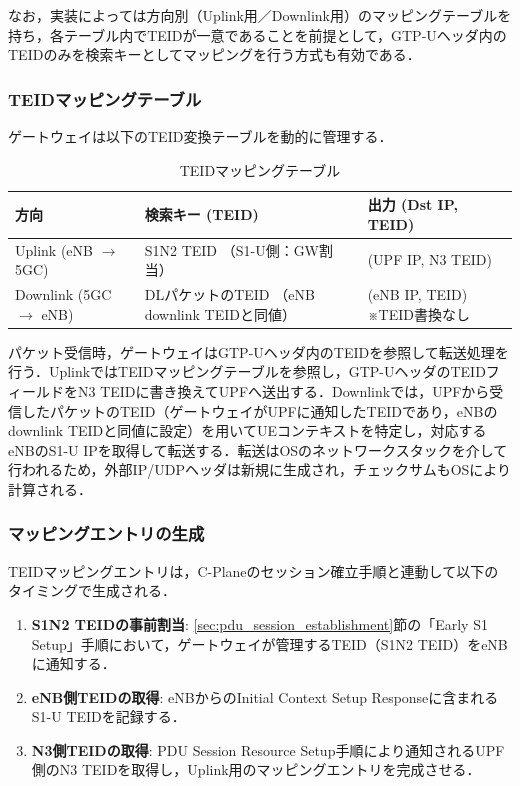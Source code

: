 なお，実装によっては方向別（Uplink用／Downlink用）のマッピングテーブルを持ち，各テーブル内でTEIDが一意であることを前提として，GTP-Uヘッダ内のTEIDのみを検索キーとしてマッピングを行う方式も有効である．

\subsubsection{TEIDマッピングテーブル}
ゲートウェイは以下のTEID変換テーブルを動的に管理する．

\begin{table}[h]
\centering
\caption{TEIDマッピングテーブル}
\label{tab:teid_mapping}
\small
\begin{tabularx}{\textwidth}{|l|X|X|}
\hline
方向 & 検索キー (TEID) & 出力 (Dst IP, TEID) \\
\hline
Uplink (eNB $\rightarrow$ 5GC) & S1N2 TEID \newline （S1-U側：GW割当） & (UPF IP, N3 TEID) \\
\hline
Downlink (5GC $\rightarrow$ eNB) & DLパケットのTEID \newline （eNB downlink TEIDと同値） & (eNB IP, TEID) \newline ※TEID書換なし \\
\hline
\end{tabularx}
\end{table}

パケット受信時，ゲートウェイはGTP-Uヘッダ内のTEIDを参照して転送処理を行う．UplinkではTEIDマッピングテーブルを参照し，GTP-UヘッダのTEIDフィールドをN3 TEIDに書き換えてUPFへ送出する．Downlinkでは，UPFから受信したパケットのTEID（ゲートウェイがUPFに通知したTEIDであり，eNBのdownlink TEIDと同値に設定）を用いてUEコンテキストを特定し，対応するeNBのS1-U IPを取得して転送する．転送はOSのネットワークスタックを介して行われるため，外部IP/UDPヘッダは新規に生成され，チェックサムもOSにより計算される．

\subsubsection{マッピングエントリの生成}
TEIDマッピングエントリは，C-Planeのセッション確立手順と連動して以下のタイミングで生成される．

\begin{enumerate}
\item \textbf{S1N2 TEIDの事前割当}: \ref{sec:pdu_session_establishment}節の「Early S1 Setup」手順において，ゲートウェイが管理するTEID（S1N2 TEID）をeNBに通知する．
\item \textbf{eNB側TEIDの取得}: eNBからのInitial Context Setup Responseに含まれるS1-U TEIDを記録する．
\item \textbf{N3側TEIDの取得}: PDU Session Resource Setup手順により通知されるUPF側のN3 TEIDを取得し，Uplink用のマッピングエントリを完成させる．
\end{enumerate}

